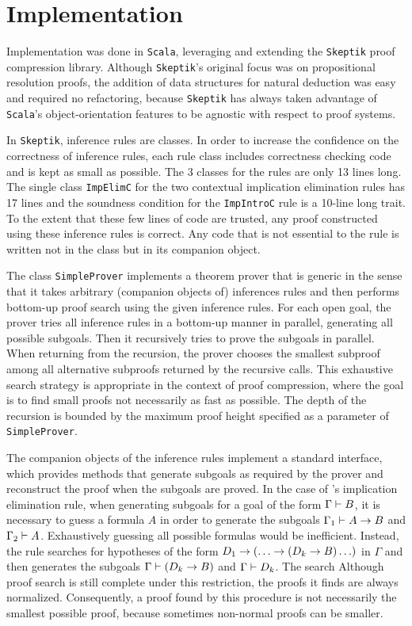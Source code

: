 \documentclass{llncs}
\newcommand{\Skeptik}{\texttt{Skeptik}\xspace}
\begin{document}
\section{Implementation}
\label{sec:Implementation}

Implementation was done in \texttt{Scala}, leveraging and extending the {\Skeptik} proof compression library. %
Although {\Skeptik}'s original focus was on propositional resolution proofs, the addition of data structures for natural deduction was easy and required no refactoring, because {\Skeptik} has always taken advantage of \texttt{Scala}'s object-orientation features to be agnostic with respect to proof systems. 

In {\Skeptik}, inference rules are classes. In order to increase the confidence on the correctness of inference rules, each rule class includes correctness checking code and is kept as small as possible. The 3 classes for the {\ND} rules are only 13 lines long. The single class \texttt{ImpElimC} for the two contextual implication elimination rules has 17 lines and the soundness condition for the \texttt{ImpIntroC} rule is a 10-line long trait. To the extent that these few lines of code are trusted, any proof constructed using these inference rules is correct. Any code that is not essential to the rule is written not in the class but in its companion object.

The class \texttt{SimpleProver} implements a theorem prover that is generic in the sense that it takes arbitrary (companion objects of) inferences rules and then performs bottom-up proof search using the given inference rules. For each open goal, the prover tries all inference rules in a bottom-up manner in parallel, generating all possible subgoals. Then it recursively tries to prove the subgoals in parallel. When returning from the recursion, the prover chooses the smallest subproof among all alternative subproofs returned by the recursive calls. This exhaustive search strategy is appropriate in the context of proof compression, where the goal is to find small proofs not necessarily as fast as possible. The depth of the recursion is bounded by the maximum proof height specified as a parameter of \texttt{SimpleProver}.

The companion objects of the inference rules implement a standard interface, which provides methods that generate subgoals as required by the prover and reconstruct the proof when the subgoals are proved. In the case of {\ND}'s implication elimination rule, when generating subgoals for a goal of the form $\Gamma \vdash B$, it is necessary to guess a formula $A$ in order to generate the subgoals $\Gamma_1 \vdash A \rightarrow B$ and $\Gamma_2 \vdash A$. Exhaustively guessing all possible formulas would be inefficient. Instead, the rule searches for hypotheses of the form $D_1 \rightarrow (\ldots \rightarrow (D_k \rightarrow B)\ldots)$ in $\Gamma$ and then generates the subgoals $\Gamma \vdash (D_k \rightarrow B)$ and $\Gamma \vdash D_k$. The search Although proof search is still complete under this restriction, the proofs it finds are always normalized. Consequently, a proof found by this procedure is not necessarily the smallest possible proof, because sometimes non-normal proofs can be smaller. 
\end{document}
